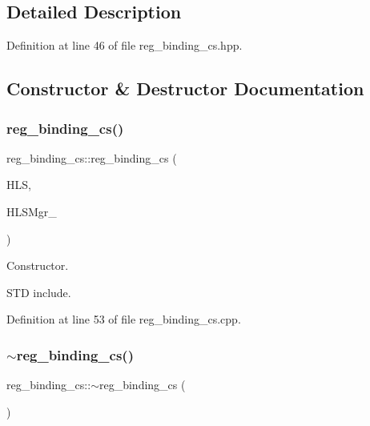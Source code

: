 \subsection{Detailed Description}


Definition at line 46 of file reg\+\_\+binding\+\_\+cs.\+hpp.



\subsection{Constructor \& Destructor Documentation}
\mbox{\label{classreg__binding__cs_a1faf5be630eda47bc3a37efc307510f0}} 
\subsubsection{\texorpdfstring{reg\+\_\+binding\+\_\+cs()}{reg\_binding\_cs()}}
{\footnotesize\ttfamily reg\+\_\+binding\+\_\+cs\+::reg\+\_\+binding\+\_\+cs (\begin{DoxyParamCaption}\item[{const \hyperlink{hls_8hpp_a75d0c73923d0ddfa28c4843a802c73a7}{hls\+Ref} \&}]{H\+LS,  }\item[{const \hyperlink{hls__manager_8hpp_acd3842b8589fe52c08fc0b2fcc813bfe}{H\+L\+S\+\_\+manager\+Ref}}]{H\+L\+S\+Mgr\+\_\+ }\end{DoxyParamCaption})}



Constructor. 

S\+TD include. 

Definition at line 53 of file reg\+\_\+binding\+\_\+cs.\+cpp.

\mbox{\label{classreg__binding__cs_a6d1af862f3a2efe11115cedaa4c5fca1}} 
\subsubsection{\texorpdfstring{$\sim$reg\+\_\+binding\+\_\+cs()}{~reg\_binding\_cs()}}
{\footnotesize\ttfamily reg\+\_\+binding\+\_\+cs\+::$\sim$reg\+\_\+binding\+\_\+cs (\begin{DoxyParamCaption}{ }\end{DoxyParamCaption})\hspace{0.3cm}{\ttfamily [virtual]}}



